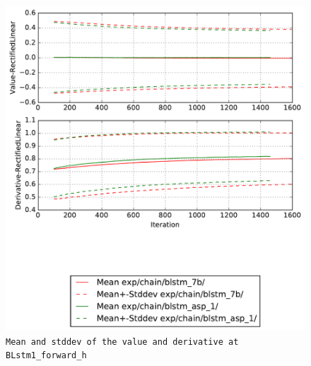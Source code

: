 \documentclass[prl,10pt,twocolumn]{revtex4}
\begin{document}
\newpage
\begin{figure}[h]
  \begin{center}
    \caption{\texttt{Mean and stddev of the value and derivative at BLstm1\_forward\_h}}
    \includegraphics[width=\textwidth]{exp/chain/blstm_7b/report/nonlinstats_BLstm1_forward_h.pdf}
  \end{center}
\end{figure}
\clearpage
\end{document}
